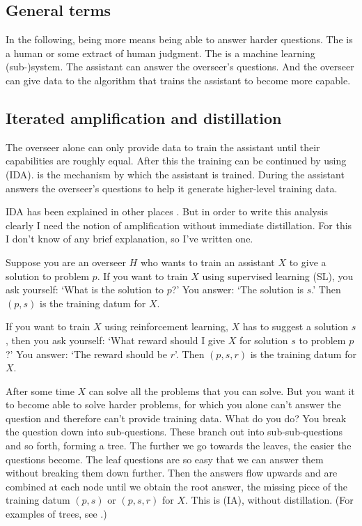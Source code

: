 \documentclass{farlamp}
\begin{document}
\subsection{General terms}

In the following, being more  means being able to answer harder
questions. The  is a human or some extract of human judgment. The
 is a machine learning (sub-)system. The assistant can answer
the overseer's questions. And the overseer can give data to the algorithm
that trains the assistant to become more capable.


\subsection{Iterated amplification and distillation}
\label{sec:iad}

The overseer alone can only provide data to train the assistant until their
capabilities are roughly equal. After this the training can be continued by
using  (IDA). 
is the mechanism by which the assistant is trained. During 
the assistant answers the overseer's questions to help it generate higher-level
training data.

IDA has been explained in other places \parencite{CotrIDA, ESSMLPIDA}. But in
order to write this analysis clearly I need the notion of amplification without
immediate distillation. For this I don't know of any brief explanation, so I've
written one.

Suppose you are an overseer $H$ who wants to train an assistant $X$
\parencite[symbols taken from][]{CSASupAmp} to give a solution to problem $p$.
If you want to train $X$ using supervised learning (SL), you ask yourself: ‘What
is the solution to $p$?’ You answer: ‘The solution is $s$.’ Then $(p, s)$ is the
training datum for $X$.

If you want to train $X$ using reinforcement learning, $X$ has to suggest a
solution $s$, then you ask yourself: ‘What reward should I give $X$ for solution
$s$ to problem $p$?’ You answer: ‘The reward should be $r$’. Then $(p, s, r)$ is
the training datum for $X$.

After some time $X$ can solve all the problems that you can solve. But you want
it to become able to solve harder problems, for which you alone can't answer the
question and therefore can't provide training data. What do you do? You break
the question down into sub-questions. These branch out into sub-sub-questions
and so forth, forming a tree. The further we go towards the leaves, the easier
the questions become. The leaf questions are so easy that we can answer them
without breaking them down further. Then the answers flow upwards and are
combined at each node until we obtain the root answer, the missing piece of the
training datum $(p, s)$ or $(p, s, r)$ for $X$. This is  (IA), without distillation. (For examples of trees, see
\textcite{StuhFacCog}.)
\end{document}
